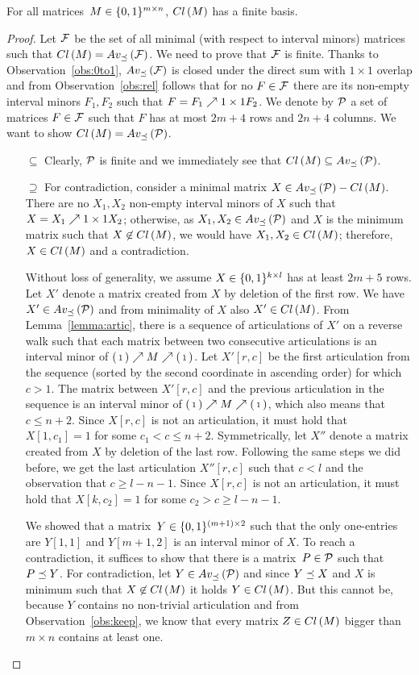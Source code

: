 \begin{thm}
For all matrices~$M\in\{0,1\}^{m\times n}$, $Cl\left(M\right)$ has a finite basis.
\end{thm}
\begin{proof}
Let $\mathcal{F}$ be the set of all minimal (with respect to interval minors) matrices such that $Cl\left(M\right)=Av_{\preceq}\left(\mathcal{F}\right)$. We need to prove that $\mathcal{F}$ is finite. Thanks to Observation~\ref{obs:0to1}, $Av_{\preceq}\left(\mathcal{F}\right)$ is closed under the direct sum with $1\times1$ overlap and from Observation~\ref{obs:rel} follows that for no $F\in\mathcal{F}$ there are its non-empty interval minors $F_1,F_2$ such that $F=F_1\nearrow{1\times1}F_2$. We denote by $\mathcal{P}$ a set of matrices $F\in\mathcal{F}$ such that $F$ has at most $2m+4$ rows and $2n+4$ columns. We want to show $Cl\left(M\right)=Av_{\preceq}\left(\mathcal{P}\right)$.
\begin{itemize}
	\item[$\subseteq$] Clearly, $\mathcal{P}$ is finite and we immediately see that $Cl\left(M\right)\subseteq Av_{\preceq}\left(\mathcal{P}\right)$.
	\item[$\supseteq$] For contradiction, consider a minimal matrix $X\in Av_{\preceq}\left(\mathcal{P}\right)-Cl\left(M\right)$.
There are no $X_1,X_2$ non-empty interval minors of $X$ such that $X=X_1\nearrow{1\times1}X_2$; otherwise, as $X_1,X_2\in Av_{\preceq}\left(\mathcal{P}\right)$ and $X$ is the minimum matrix such that $X\not\in Cl\left(M\right)$, we would have $X_1,X_2\in Cl\left(M\right)$; therefore, $X\in Cl\left(M\right)$ and a contradiction.

Without loss of generality, we assume $X\in\{0,1\}^{k\times l}$ has at least $2m+5$ rows. Let $X'$ denote a matrix created from $X$ by deletion of the first row. We have $X'\in Av_{\preceq}\left(\mathcal{P}\right)$ and from minimality of $X$ also $X'\in Cl\left(M\right)$. From Lemma~\ref{lemma:artic}, there is a sequence of articulations of $X'$ on a reverse walk such that each matrix between two consecutive articulations is an interval minor of $\left(\begin{smallmatrix}1\end{smallmatrix}\right)\nearrow M\nearrow\left(\begin{smallmatrix}1\end{smallmatrix}\right)$. Let $X'[r,c]$ be the first articulation from the sequence (sorted by the second coordinate in ascending order) for which $c>1$. The matrix between $X'[r,c]$ and the previous articulation in the sequence is an interval minor of $\left(\begin{smallmatrix}1\end{smallmatrix}\right)\nearrow M\nearrow\left(\begin{smallmatrix}1\end{smallmatrix}\right)$, which also means that $c\leq n+2$. Since $X[r,c]$ is not an articulation, it must hold that $X[1,c_1]=1$ for some $c_1<c\leq n+2$. Symmetrically, let $X''$ denote a matrix created from $X$ by deletion of the last row. Following the same steps we did before, we get the last articulation $X''[r,c]$ such that $c<l$ and the observation that $c\geq l-n-1$. Since $X[r,c]$ is not an articulation, it must hold that $X[k,c_2]=1$ for some $c_2>c\geq l-n-1$.

We showed that a matrix~$Y\in\{0,1\}^{(m+1)\times2}$ such that the only one-entries are $Y[1,1]$ and $Y[m+1,2]$ is an interval minor of $X$. To reach a contradiction, it suffices to show that there is a matrix~$P\in\mathcal{P}$ such that $P\preceq Y$. For contradiction, let $Y\in Av_{\preceq}\left(\mathcal{P}\right)$ and since $Y\preceq X$ and $X$ is minimum such that $X\not\in Cl\left(M\right)$ it holds $Y\in Cl\left(M\right)$. But this cannot be, because $Y$ contains no non-trivial articulation and from Observation~\ref{obs:keep}, we know that every matrix $Z\in Cl\left(M\right)$ bigger than $m\times n$ contains at least one.
\end{itemize}
\end{proof}

